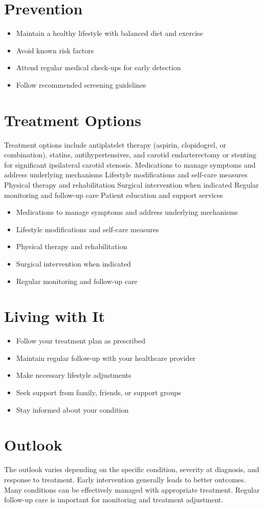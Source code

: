 \section{Prevention}
\begin{itemize}[noitemsep]
  \item Maintain a healthy lifestyle with balanced diet and exercise
  \item Avoid known risk factors
  \item Attend regular medical check-ups for early detection
  \item Follow recommended screening guidelines
\end{itemize}
\section{Treatment Options}
Treatment options include antiplatelet therapy (aspirin, clopidogrel, or combination), statins, antihypertensives, and carotid endarterectomy or stenting for significant ipsilateral carotid stenosis. Medications to manage symptoms and address underlying mechanisms Lifestyle modifications and self-care measures Physical therapy and rehabilitation Surgical intervention when indicated Regular monitoring and follow-up care Patient education and support services

\begin{itemize}[noitemsep]
  \item Medications to manage symptoms and address underlying mechanisms
  \item Lifestyle modifications and self-care measures
  \item Physical therapy and rehabilitation
  \item Surgical intervention when indicated
  \item Regular monitoring and follow-up care
\end{itemize}
\section{Living with It}
\begin{itemize}[noitemsep]
  \item Follow your treatment plan as prescribed
  \item Maintain regular follow-up with your healthcare provider
  \item Make necessary lifestyle adjustments
  \item Seek support from family, friends, or support groups
  \item Stay informed about your condition
\end{itemize}
\section{Outlook}
The outlook varies depending on the specific condition, severity at diagnosis, and response to treatment. Early intervention generally leads to better outcomes. Many conditions can be effectively managed with appropriate treatment. Regular follow-up care is important for monitoring and treatment adjustment.
